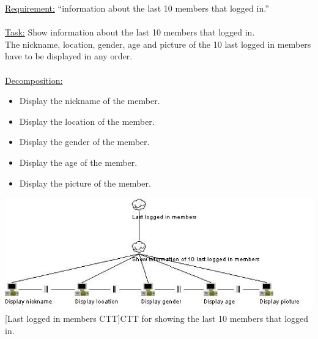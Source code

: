 \documentclass[11pt, a4paper,svglistings,oneside]{book}
\begin{document}
\underline{Requirement:} ``information about the last 10 members that logged in.'' \\ \\
\underline{Task:} Show information about the last 10 members that logged in. \\
The nickname, location, gender, age and picture of the 10 last logged in members have to be displayed in any order. \\ \\
\underline{Decomposition:}
\begin{itemize}
\item Display the nickname of the member.
\item Display the location of the member.
\item Display the gender of the member.
\item Display the age of the member.
\item Display the picture of the member.
\end{itemize}
\noindent\begin{minipage}{\textwidth}
    \centering
   \includegraphics[width=\textwidth]{CTT_Members.png}
 [Last logged in members CTT]{CTT for showing the last 10 members that logged in.}
\end{minipage}
\end{document}
